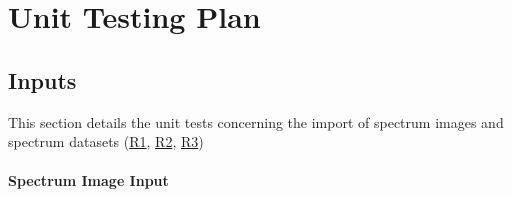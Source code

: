 \documentclass[12pt, titlepage]{article}
\begin{document}
				
\section{Unit Testing Plan}
\label{sec:UnitTest}

\subsection{Inputs}
This section details the unit tests concerning the import of spectrum
images and spectrum datasets (\hyperref[R_SI_inputs]{R1},
\hyperref[R_spectrum_inputs]{R2}, \hyperref[R_Input_dimension]{R3})

\paragraph{Spectrum Image Input}
\end{document}

